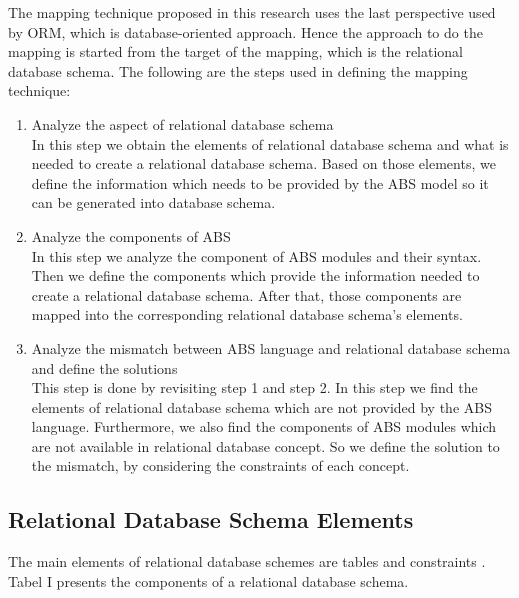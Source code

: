 \documentclass[conference]{IEEEtran}
\begin{document}
The mapping technique proposed in this research uses the last perspective used by ORM, which is database-oriented approach. Hence the approach to do the mapping is started from the target of the mapping, which is the relational database schema. The following are the steps used in defining the mapping technique:

\begin{enumerate}
	\item Analyze the aspect of relational database schema\\
	In this step we obtain the elements of relational database schema and what is needed to create a relational database schema. Based on those elements, we define the information which needs to be provided by the ABS model so it can be generated into database schema.
	\item Analyze the components of ABS\\
	In this step we analyze the component of ABS modules and their syntax. Then we define the components which provide the information needed to create a relational database schema. After that, those components are mapped into the corresponding relational database schema’s elements.
	\item Analyze the mismatch between ABS language and relational database schema and define the solutions\\
	This step is done by revisiting step 1 and step 2. In this step we find the elements of relational database schema which are not provided by the ABS language. Furthermore, we also find the components of ABS modules which are not available in relational database concept. So we define the solution to the mismatch, by considering the constraints of each concept.
\end{enumerate}

\subsection{Relational Database Schema Elements}
The main elements of relational database schemes are tables and constraints \cite{book2}. Tabel I presents the components of a relational database schema.
\end{document}

